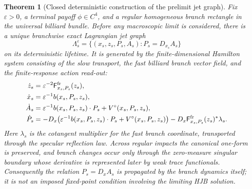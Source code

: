 \documentclass[12pt, letterpaper]{amsart}
\newcommand{\Ffast}{\mathsf F}
\theoremstyle{plain}
\newtheorem{theorem}{Theorem}[section]
\theoremstyle{definition}
\theoremstyle{remark}
\begin{document}
\begin{theorem}[Closed deterministic construction of the prelimit jet graph]
\label{thm:closed_prelimit_jet_graph_construction}
Fix \(\varepsilon>0\), a terminal payoff \(\phi\in C^4\), and a regular
homogeneous branch rectangle in the universal billiard bundle.  Before any
macroscopic limit is considered, there is a unique branchwise exact Lagrangian
jet graph
\[
   \Lambda_s^\varepsilon
   =\{(x_s,z_s,P_s,A_s): P_s=D_{x_s}A_s\}
\]
on its deterministic lifetime.  It is generated by the finite-dimensional
Hamilton system consisting of the slow transport, the fast billiard branch
vector field, and the finite-response action read-out:
\begin{align}
   \dot z_s&=\varepsilon^{-2}\Ffast^{\rm fr}_{x_s,P_s}(z_s),\nonumber\\
   \dot x_s&=\varepsilon^{-1} b(x_s,P_s,z_s),\nonumber\\
   \dot A_s&=\varepsilon^{-1}b(x_s,P_s,z_s)\cdot P_s+V^\circ(x_s,P_s,z_s),
      \label{eq:closed_prelimit_characteristic_system}\\
   \dot P_s&=-D_x\bigl(\varepsilon^{-1}b(x_s,P_s,z_s)\cdot P_s
      +V^\circ(x_s,P_s,z_s)\bigr)
      -D_x\Ffast^{\rm fr}_{x_s,P_s}(z_s)^*\lambda_s .\nonumber
\end{align}
Here \(\lambda_s\) is the cotangent multiplier for the fast branch coordinate,
transported through the specular reflection law.  Across regular impacts the
canonical one-form is preserved, and branch changes occur only through the
zero-measure singular boundary whose derivative is represented later by weak
trace functionals.  Consequently the relation \(P_s=D_xA_s\) is propagated by
the branch dynamics itself; it is not an imposed fixed-point condition involving
the limiting HJB solution.
\end{theorem}
\end{document}
